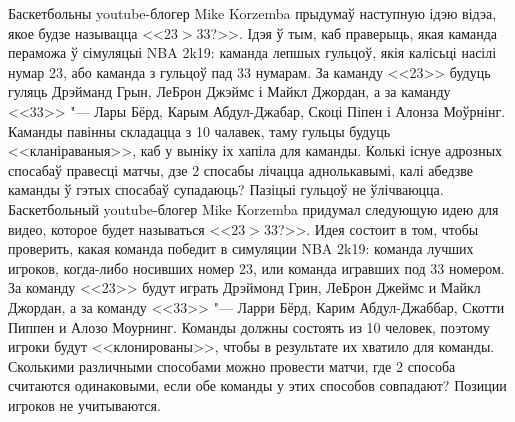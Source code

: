 \documentclass[11pt, a4paper]{article}
\begin{document}
\begin{problemList}
\medskip

\problemItemSimple
{Баскетбольны youtube-блогер Mike Korzemba прыдумаў наступную ідэю відэа, якое будзе называцца <<$23 > 33$?>>.
Ідэя ў тым, каб праверыць, якая каманда пераможа ў сімуляцыі NBA 2k19: каманда лепшых гульцоў, якія калісьці насілі нумар 23, або каманда з гульцоў пад 33 нумарам.
За каманду <<23>> будуць гуляць Дрэйманд Грын, ЛеБрон Джэймс і Майкл Джордан,
а за каманду <<33>> "--- Лары Бёрд, Карым Абдул-Джабар, Скоці Піпен і Алонза Моўрнінг.
Каманды павінны складацца з 10 чалавек, таму гульцы будуць <<кланіраваныя>>, каб у выніку іх хапіла для каманды.
Колькі існуе адрозных спосабаў правесці матчы, дзе 2 спосабы лічацца аднолькавымі,
калі абедзве каманды ў гэтых спосабаў супадаюць? Пазіцыі гульцоў не ўлічваюцца.}
{Баскетбольный youtube-блогер Mike Korzemba придумал следующую идею для видео, которое будет называться <<$23 > 33$?>>.
Идея состоит в том, чтобы проверить, какая команда победит в симуляции NBA 2k19: команда лучших игроков, когда-либо носивших номер 23, или команда игравших под 33 номером.
За команду <<23>> будут играть Дрэймонд Грин, ЛеБрон Джеймс и Майкл Джордан,
а за команду <<33>> "--- Ларри Бёрд, Карим Абдул-Джаббар, Скотти Пиппен и Алозо Моурнинг.
Команды должны состоять из 10 человек, поэтому игроки будут <<клонированы>>, чтобы в результате их хватило для команды.
Сколькими различными способами можно провести матчи, где 2 способа считаются одинаковыми,
если обе команды у этих способов совпадают? Позиции игроков не учитываются.}

\end{problemList}
\end{document}
